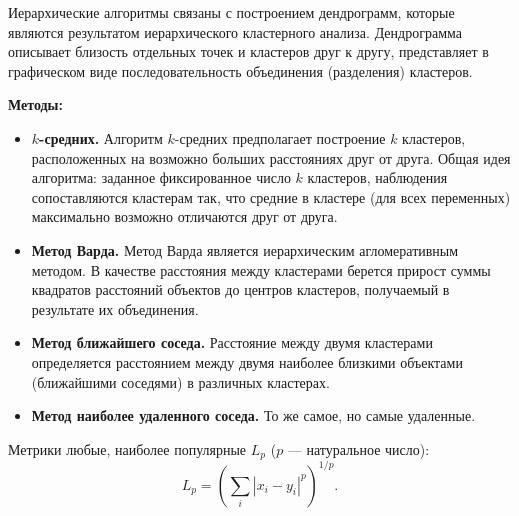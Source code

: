 Иерархические алгоритмы связаны с построением дендрограмм, которые являются результатом иерархического кластерного анализа. Дендрограмма описывает близость отдельных точек и кластеров друг к другу, представляет в графическом виде последовательность объединения (разделения) кластеров.

\textbf{Методы:}
\begin{itemize}
  \item \textbf{$k$-средних.} Алгоритм $k$-средних предполагает построение $k$ кластеров, расположенных на возможно больших расстояниях друг от друга. Общая идея алгоритма: заданное фиксированное число $k$ кластеров, наблюдения сопоставляются кластерам так, что средние в кластере (для всех переменных) максимально возможно отличаются друг от друга.
  \item \textbf{Метод Варда.} Метод Варда является иерархическим агломеративным методом. В качестве расстояния между кластерами берется прирост суммы квадратов расстояний объектов до центров кластеров, получаемый в результате их объединения.
  \item \textbf{Метод ближайшего соседа.} Расстояние между двумя кластерами определяется расстоянием между двумя наиболее близкими объектами (ближайшими соседями) в различных кластерах.
  \item \textbf{Метод наиболее удаленного соседа.} То же самое, но самые удаленные.
\end{itemize}

Метрики любые, наиболее популярные $L_p$ ($p$ — натуральное число):
\[
  L_p = \left(\sum_i |x_i-y_i|^p\right)^{1/p}.
\]

\clearpage

